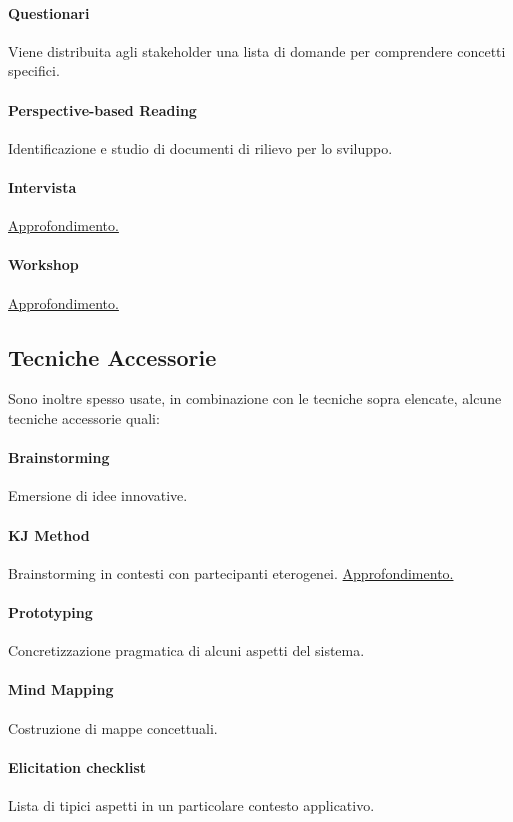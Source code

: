 \paragraph{Questionari} Viene distribuita agli stakeholder una lista di domande per comprendere concetti specifici.
\paragraph{Perspective-based Reading} Identificazione e studio di documenti di rilievo per lo sviluppo.
\paragraph{Intervista} \hyperref[intervista]{Approfondimento.} 
\paragraph{Workshop} \hyperref[workshop]{Approfondimento.}
\subsection{Tecniche Accessorie}
\label{tecniche-accessorie}
Sono inoltre spesso usate, in combinazione con le tecniche sopra elencate, alcune tecniche accessorie quali:
\paragraph{Brainstorming} Emersione di idee innovative.
\paragraph{KJ Method} Brainstorming in contesti con partecipanti eterogenei.
\hyperref[kjmethod]{Approfondimento.}
\paragraph{Prototyping} Concretizzazione pragmatica di alcuni aspetti del sistema.
\paragraph{Mind Mapping} Costruzione di mappe concettuali.
\paragraph{Elicitation checklist} Lista di tipici aspetti in un particolare contesto applicativo.
